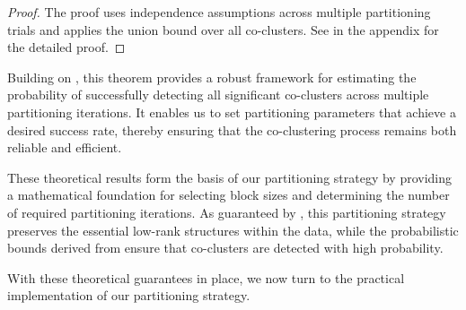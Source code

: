 \documentclass[journal]{IEEEtran}
\theoremstyle{definition}
\theoremstyle{remark} %
\begin{document}
{\color{blue}
\begin{proof}
    The proof uses independence assumptions across multiple partitioning trials and applies the union bound over all co-clusters. See  in the appendix for the detailed proof.
\end{proof}
}

Building on , this theorem provides a robust framework for estimating the probability of successfully detecting all significant co-clusters across multiple partitioning iterations. It enables us to set partitioning parameters that achieve a desired success rate, thereby ensuring that the co-clustering process remains both reliable and efficient.

These theoretical results form the basis of our partitioning strategy by providing a mathematical foundation for selecting block sizes and determining the number of required partitioning iterations. As guaranteed by , this partitioning strategy preserves the essential low-rank structures within the data, while the probabilistic bounds derived from  ensure that co-clusters are detected with high probability.

With these theoretical guarantees in place, we now turn to the practical implementation of our partitioning strategy.
\end{document}

